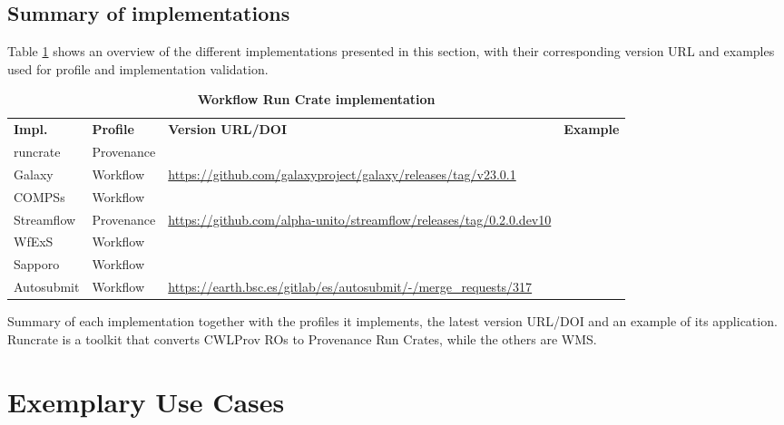 \documentclass[10pt,letterpaper]{article}
\newlength\savedwidth
\newcommand\thickhline{\noalign{\global\savedwidth\arrayrulewidth\global\arrayrulewidth 2pt}%
\hline
\noalign{\global\arrayrulewidth\savedwidth}}
\begin{document}
\subsection{Summary of implementations}

Table \ref{implementation_summary_table} shows an overview of the different implementations presented in this section, with their corresponding version URL and examples used for profile and implementation validation.

\begin{table}[!ht]
  \begin{adjustwidth}{-1.4cm}{0in} %
  \centering
  \caption{
  {\bf Workflow Run Crate implementation}}
  \begin{tabular}{l|l|l|l}
  \hline
  {\bf Impl.} & {\bf Profile} & {\bf Version URL/DOI} &
  {\bf Example}\\
  \thickhline
  runcrate & Provenance & \cite{runcrate}  & \cite{run-pathology} \\
  Galaxy & Workflow & \tiny \url{https://github.com/galaxyproject/galaxy/releases/tag/v23.0.1} & \cite{De Geest 2023} \\
  COMPSs & Workflow & \cite{Ejarque 2023} & \cite{Poiata 2023} \\
  Streamflow & Provenance & \tiny \url{https://github.com/alpha-unito/streamflow/releases/tag/0.2.0.dev10} & \cite{Colonnelli 2023} \\
  WfExS & Workflow & \cite{Fernández 2023a} & \cite{Fernández 2023b} \\
  Sapporo & Workflow & \cite{Suetake 2023b} & \cite{Ohta 2023} \\
  Autosubmit & Workflow & \tiny \url{https://earth.bsc.es/gitlab/es/autosubmit/-/merge_requests/317} & \cite{Kinoshita 2023} \\
  \end{tabular}
  \begin{flushleft} 
    Summary of each implementation together with the profiles it implements, the latest version URL/DOI and an example of its application. Runcrate is a toolkit that converts CWLProv ROs to Provenance Run Crates, while the others are WMS.
  \end{flushleft}
  \label{implementation_summary_table}
  \end{adjustwidth}
\end{table}
  


\section{Exemplary Use Cases}\label{exemplary-use-cases}
\end{document}
